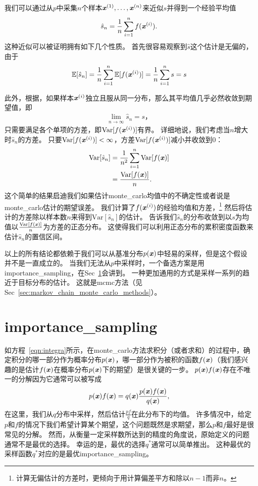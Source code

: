 我们可以通过从$p$中采集$n$个样本$\boldsymbol{\mathit{x}}^{(1)},\ldots,\boldsymbol{\mathit{x}}^{(n)}$来近似$s$并得到一个经验平均值
\begin{align}
\hat{s}_n = \frac{1}{n}\sum_{i=1}^{n}f(\boldsymbol{\mathit{x}}^{(i)}).
\end{align}
这种近似可以被证明拥有如下几个性质。
首先很容易观察到$\hat{s}$这个估计是无偏的，由于
\begin{align}
\mathbb{E}[\hat{s}_n] = \frac{1}{n}\sum_{i=1}^{n}\mathbb{E}[f(\boldsymbol{\mathit{x}}^{(i)})] = \frac{1}{n}\sum_{i=1}^{n}s = s
\end{align}

此外，根据，如果样本$\boldsymbol{\mathit{x}}^{(i)}$独立且服从同一分布，那么其平均值几乎必然收敛到期望值，即
\begin{align}
\lim_{n\xrightarrow{}\infty} \hat{s}_n = s，
\end{align}
只需要满足各个单项的方差，即$\text{Var}[f(\boldsymbol{\mathit{x}}^{(i)})]$有界。
详细地说，我们考虑当$n$增大时$\hat{s}_n$的方差。
只要$\text{Var}[f(\boldsymbol{\mathit{x}}^{(i)})]<\infty$，方差$\text{Var}[f(\boldsymbol{\mathit{x}}^{(i)})]$减小并收敛到0：
\begin{align}
\text{Var}[\hat{s}_n] & = \frac{1}{n^2}\sum_{i=1}^{n}\text{Var}[f(\boldsymbol{\mathit{x}})]\\
&  = \frac{\text{Var}[f(\boldsymbol{\mathit{x}})]}{n}.
\end{align}
这个简单的结果启迪我们如果估计\gls{monte_carlo}均值中的不确定性或者说是\gls{monte_carlo}估计的期望误差。
我们计算了$f(\boldsymbol{\mathit{x}}^{(i)})$的经验均值和方差，\footnote{计算无偏估计的方差时，更倾向于用计算偏差平方和除以$n-1$而非$n$。}
然后将估计的方差除以样本数$n$来得到$\text{Var}[\hat{s}_n]$的估计。
告诉我们$\hat{s}_n$的分布收敛到以$s$为均值以$\frac{\text{Var}[f(\boldsymbol{\mathit{x}})]}{n}$为方差的正态分布。
这使得我们可以利用正态分布的累积密度函数来估计$\hat{s}_n$的置信区间。

以上的所有结论都依赖于我们可以从基准分布$p(\boldsymbol{\mathit{x}})$中轻易的采样，但是这个假设并不是一直成立的。
当我们无法从$p$中采样时，一个备选方案是用\gls{importance_sampling}，在Sec~\ref{sec:importance_sampling}会讲到。
一种更加通用的方式是采样一系列的趋近于目标分布的估计。
这就是\gls{mcmc}方法（见Sec~\ref{sec:markov_chain_monte_carlo_methods}）。

\section{\gls{importance_sampling}}
\label{sec:importance_sampling}

如方程~\eqref{eqn:integra}所示，在\gls{monte_carlo}方法求积分（或者求和）的过程中，确定积分的哪一部分作为概率分布$p(\boldsymbol{\mathit{x}})$，哪一部分作为被积的函数$f(\boldsymbol{\mathit{x}})$（我们感兴趣的是估计$f(\boldsymbol{\mathit{x}})$在概率分布$p(\boldsymbol{\mathit{x}})$下的期望）是很关键的一步。
$p(\boldsymbol{\mathit{x}})f(\boldsymbol{\mathit{x}})$存在不唯一的分解因为它通常可以被写成
\begin{align}
\label{eqn:decomposition}
p(\boldsymbol{\mathit{x}})f(\boldsymbol{\mathit{x}}) = q(\boldsymbol{\mathit{x}}) \frac{p(\boldsymbol{\mathit{x}})f(\boldsymbol{\mathit{x}})}{q(\boldsymbol{\mathit{x}})},
\end{align}
在这里，我们从$q$分布中采样，然后估计$\frac{pf}{q}$在此分布下的均值。
许多情况中，给定$p$和$f$的情况下我们希望计算某个期望，这个问题既然是求期望，那么$p$和$f$最好是很常见的分解。
然而，从衡量一定采样数所达到的精度的角度说，原始定义的问题通常不是最优的选择。
幸运的是，最优的选择$q^*$通常可以简单推出。
这种最优的采样函数$q^*$对应的是最优\gls{importance_sampling}。


